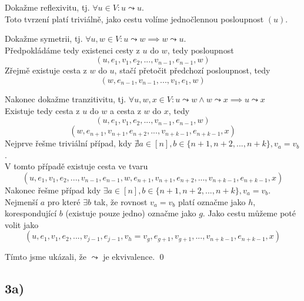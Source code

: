\documentclass[../main.tex]{subfiles}
\begin{document}
Dokažme reflexivitu, tj. $\forall u\in V: u\leadsto u$.\\
Toto tvrzení platí triviálně, jako cestu volíme jednočlennou posloupnost $(u)$.

Dokažme symetrii, tj. $\forall u,w\in V: u\leadsto w \implies w\leadsto u$.\\
Předpokládáme tedy existenci cesty z $u$ do $w$, tedy posloupnost 
\begin{equation*}
    (u, e_1, v_1, e_2, ..., v_{n-1}, e_{n-1}, w)
\end{equation*}
Zřejmě existuje cesta z $w$ do $u$, stačí přetočit předchozí posloupnost, tedy
\begin{equation*}
    (w, e_{n-1}, v_{n-1}, ..., v_1, e_1, w)
\end{equation*}

Nakonec dokažme tranzitivitu, tj. $\forall u,w,x\in V: u\leadsto w \wedge w\leadsto x \implies u\leadsto x$\\
Existuje tedy cesta z $u$ do $w$ a cesta z $w$ do $x$, tedy
\begin{equation*}
    (u, e_1, v_1, e_2, ..., v_{n-1}, e_{n-1}, w)
\end{equation*}
\begin{equation*}
    (w, e_{n+1}, v_{n+1}, e_{n+2}, ..., v_{n+k-1}, e_{n+k-1}, x)
\end{equation*}
Nejprve řešme triviální případ, kdy $\nexists a \in [n], b \in \{n+1, n+2, ..., n+k\}, v_a = v_b$ .\\
V tomto případě existuje cesta ve tvaru
\begin{equation*}
    (u, e_1, v_1, e_2, ..., v_{n-1}, e_{n-1}, w, e_{n+1}, v_{n+1}, e_{n+2}, ..., v_{n+k-1}, e_{n+k-1}, x)
\end{equation*} 
Nakonec řešme případ kdy $\exists a \in [n], b \in \{n+1, n+2, ..., n+k\}, v_a = v_b$.\\
Nejmenší $a$ pro které $\exists b$ tak, že rovnost $v_a = v_b$ platí označme jako $h$, korespondující $b$ (existuje pouze jedno) označme jako $g$.
Jako cestu můžeme poté volit jako
\begin{equation*}
    (u, e_1, v_1, e_2, ..., v_{j-1}, e_{j-1}, v_h = v_g , e_{g+1}, v_{g+1},..., v_{n+k-1}, e_{n+k-1}, x)
\end{equation*} 

Tímto jsme ukázali, že $\leadsto$ je ekvivalence.  
\qed


\subsection*{3a)}
\end{document}
